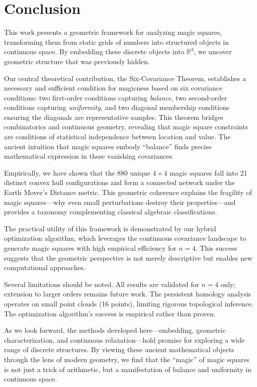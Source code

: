 \section{Conclusion}\label{sec:conclusion}

This work presents a geometric framework for analyzing magic squares, transforming them from static grids of numbers into structured objects in continuous space. By embedding these discrete objects into $\mathbb{R}^3$, we uncover geometric structure that was previously hidden.

Our central theoretical contribution, the Six-Covariance Theorem, establishes a necessary and sufficient condition for magicness based on six covariance conditions: two first-order conditions capturing \textit{balance}, two second-order conditions capturing \textit{uniformity}, and two diagonal membership conditions ensuring the diagonals are representative samples. This theorem bridges combinatorics and continuous geometry, revealing that magic square constraints are conditions of statistical independence between location and value. The ancient intuition that magic squares embody ``balance'' finds precise mathematical expression in these vanishing covariances.

Empirically, we have shown that the 880 unique $4 \times 4$ magic squares fall into 21 distinct convex hull configurations and form a connected network under the Earth Mover's Distance metric. This geometric coherence explains the fragility of magic squares---why even small perturbations destroy their properties---and provides a taxonomy complementing classical algebraic classifications.

The practical utility of this framework is demonstrated by our hybrid optimization algorithm, which leverages the continuous covariance landscape to generate magic squares with high empirical efficiency for $n=4$. This success suggests that the geometric perspective is not merely descriptive but enables new computational approaches.

Several limitations should be noted. All results are validated for $n=4$ only; extension to larger orders remains future work. The persistent homology analysis operates on small point clouds (16 points), limiting rigorous topological inference. The optimization algorithm's success is empirical rather than proven.

As we look forward, the methods developed here---embedding, geometric characterization, and continuous relaxation---hold promise for exploring a wide range of discrete structures. By viewing these ancient mathematical objects through the lens of modern geometry, we find that the ``magic'' of magic squares is not just a trick of arithmetic, but a manifestation of balance and uniformity in continuous space.

